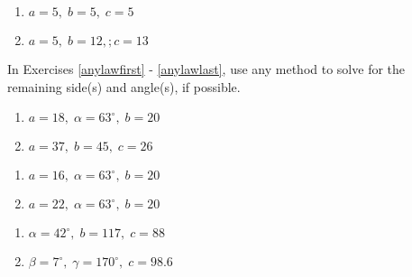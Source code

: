 \documentclass{ximera}
\begin{document}
\begin{multicols}{2} 

\begin{enumerate}

\setcounter{enumi}{\value{HW}}

\item $a = 5, \; b = 5, \; c = 5$
\item $a = 5, \; b = 12,; c = 13$ \label{thirdherons} \label{lastlawofcosines}

\setcounter{HW}{\value{enumi}}

\end{enumerate}

\end{multicols}

In Exercises \ref{anylawfirst} - \ref{anylawlast}, use any method to solve for the remaining side(s) and angle(s), if possible.

\begin{multicols}{2}

\begin{enumerate}

\setcounter{enumi}{\value{HW}}

\item $a = 18, \; \alpha = 63^{\circ}, \; b = 20$ \label{ambigfirst} \label{anylawfirst}
\item $a = 37, \; b = 45, \; c = 26$

\setcounter{HW}{\value{enumi}}

\end{enumerate}

\end{multicols}

\begin{multicols}{2} 

\begin{enumerate}

\setcounter{enumi}{\value{HW}}

\item $a = 16, \; \alpha = 63^{\circ}, \; b = 20$ \label{ambigsecond}
\item $a = 22, \; \alpha = 63^{\circ}, \; b = 20$ \label{ambigthird}

\setcounter{HW}{\value{enumi}}

\end{enumerate}

\end{multicols}

\begin{multicols}{2} 

\begin{enumerate}

\setcounter{enumi}{\value{HW}}

\item $\alpha = 42^{\circ}, \; b = 117, \; c = 88$
\item $\beta = 7^{\circ}, \; \gamma = 170^{\circ}, \; c = 98.6$ \label{anylawlast}

\setcounter{HW}{\value{enumi}}

\end{enumerate}

\end{multicols}
\end{document}
